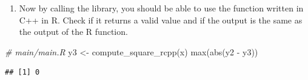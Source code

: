\documentclass[
]{book}
\newenvironment{Shaded}{\begin{snugshade}}{\end{snugshade}}
\newcommand{\CommentTok}[1]{\textcolor[rgb]{0.56,0.35,0.01}{\textit{#1}}}
\newcommand{\FunctionTok}[1]{\textcolor[rgb]{0.00,0.00,0.00}{#1}}
\newcommand{\NormalTok}[1]{#1}
\newcommand{\OtherTok}[1]{\textcolor[rgb]{0.56,0.35,0.01}{#1}}
\newcommand{\SpecialCharTok}[1]{\textcolor[rgb]{0.00,0.00,0.00}{#1}}
\providecommand{\tightlist}{%
  \setlength{\itemsep}{0pt}\setlength{\parskip}{0pt}}
\begin{document}
\begin{enumerate}
\def\labelenumi{\arabic{enumi}.}
\setcounter{enumi}{10}
\tightlist
\item
  Now by calling the library, you should be able to use the function written in C++ in R. Check if it returns a valid value and if the output is the same as the output of the R function.
\end{enumerate}

\begin{Shaded}
\begin{Highlighting}[]
\CommentTok{\# main/main.R}
\NormalTok{y3 }\OtherTok{\textless{}{-}} \FunctionTok{compute\_square\_rcpp}\NormalTok{(x)}
\FunctionTok{max}\NormalTok{(}\FunctionTok{abs}\NormalTok{(y2 }\SpecialCharTok{{-}}\NormalTok{ y3))}
\end{Highlighting}
\end{Shaded}

\begin{verbatim}
## [1] 0
\end{verbatim}
\end{document}
